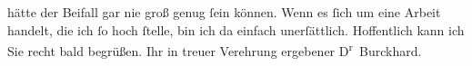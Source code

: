\begin{ledgroupsized}[t]{13cm}
                    hätte der Beifall gar nie groß genug ſein können. Wenn es ſich um eine Arbeit
                    handelt, die ich ſo hoch ſtelle, bin ich da einfach unerſättlich. Hoffentlich
                    kann ich Sie recht bald begrüßen.\pend
           \pstart Ihr in treuer Verehrung ergebener \spacefill\mbox{D\textsuperscript{r}
                        Burckhard.}\pend{}\endnumbering{}\end{ledgroupsized}  \newcommand{\dateiname}{L01987}\newcommand{\titel}{Max Burckhard an Arthur Schnitzler, 25. 11. 1910}\newcommand{\editorInnen}{Martin Anton Müller und Gerd-Hermann Susen}
      